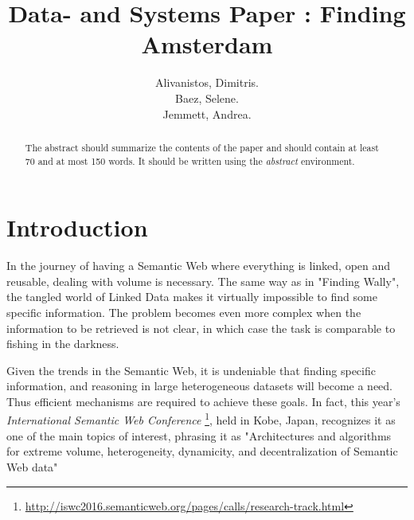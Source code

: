 \documentclass[runningheads,a4paper]{../../StyleFiles/llncs}
\begin{document}
\mainmatter  %

\title{Data- and Systems Paper : Finding Amsterdam}


%
%
\author{Alivanistos, Dimitris. \\ Baez, Selene. \\ Jemmett, Andrea. }
%


\maketitle


\begin{abstract}
The abstract should summarize the contents of the paper and should
contain at least 70 and at most 150 words. It should be written using the
\emph{abstract} environment.
\end{abstract}


\section{Introduction}
In the journey of having a Semantic Web where everything is linked, open and reusable, dealing with volume is necessary. The same way as in "Finding Wally", the tangled world of Linked Data makes it virtually impossible to find some specific information. The problem becomes even more complex when the information to be retrieved is not clear, in which case the task is comparable to fishing in the darkness.

Given the trends in the Semantic Web, it is undeniable that finding specific information, and reasoning in large heterogeneous datasets will become a need. Thus efficient mechanisms are required to achieve these goals. In fact, this year's \textit{International Semantic Web Conference} \footnote{\url{http://iswc2016.semanticweb.org/pages/calls/research-track.html}}, held in Kobe, Japan, recognizes it as one of the main topics of interest, phrasing it as "Architectures and algorithms for extreme volume, heterogeneity, dynamicity, and decentralization of Semantic Web data"
\end{document}
